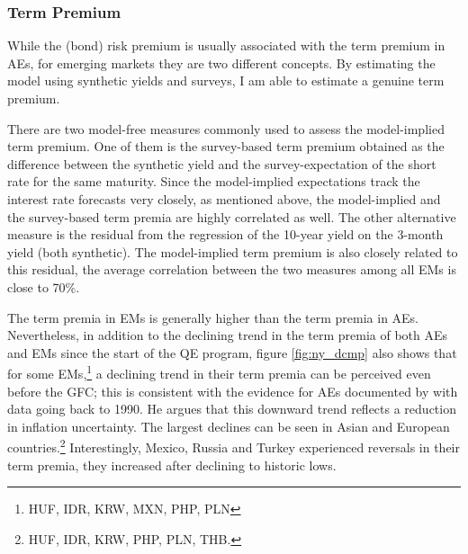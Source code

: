 {\subsubsection{Term Premium}
While the (bond) risk premium is usually associated with the term premium in AEs, for emerging markets they are two different concepts.
By estimating the model using synthetic yields and surveys, I am able to estimate a genuine term premium.


There are two model-free measures commonly used to assess the model-implied term premium.
One of them is the survey-based term premium obtained as the difference between the synthetic yield and the survey-expectation of the short rate for the same maturity.
Since the model-implied expectations track the interest rate forecasts very closely, as mentioned above, the model-implied and the survey-based term premia are highly correlated as well.
The other alternative measure is the residual from the regression of the 10-year yield on the 3-month yield (both synthetic).
The model-implied term premium is also closely related to this residual, the average correlation between the two measures among all EMs is close to 70\%.


The term premia in EMs is generally higher than the term premia in AEs.
Nevertheless, in addition to the declining trend in the term premia of both AEs and EMs since the start of the QE program, figure \ref{fig:ny_dcmp} also shows that for some EMs,\footnote{HUF, IDR, KRW, MXN, PHP, PLN} a declining trend in their term premia can be perceived even before the GFC; this is consistent with the evidence for AEs documented by \cite{Wright:2011} with data going back to 1990.
He argues that this downward trend reflects a reduction in inflation uncertainty.
The largest declines can be seen in Asian and European countries.\footnote{ HUF, IDR, KRW, PHP, PLN, THB.}
Interestingly, Mexico, Russia and Turkey experienced reversals in their term premia, they increased after declining to historic lows.


}
